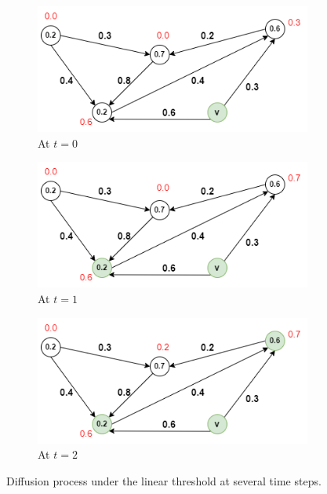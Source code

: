 \begin{figure}[!h]
\centering
\begin{subfigure}{0.3\textwidth}
    \includegraphics[width=\textwidth]{GSSI_thesisProposal/figures/lt1.png}
    \caption{At $t=0$}
    \label{fig:lt1}
\end{subfigure}
\hfill
\begin{subfigure}{0.3\textwidth}
    \includegraphics[width=\textwidth]{GSSI_thesisProposal/figures/lt2.png}
    \caption{At $t=1$}
    \label{fig:lt2}
\end{subfigure}
\hfill
\begin{subfigure}{0.3\textwidth}
    \includegraphics[width=\textwidth]{GSSI_thesisProposal/figures/lt3.png}
    \caption{At $t=2$}
    \label{fig:lt3}
\end{subfigure}
\caption{Diffusion process under the linear threshold at several time steps.}
\label{fig:linear}
\end{figure}





